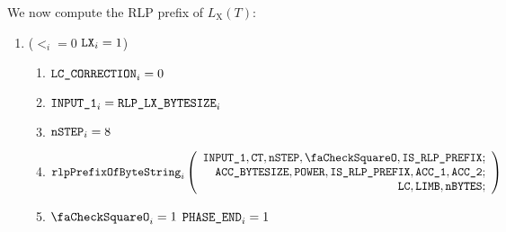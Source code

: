 We now compute the RLP prefix of $L_{\mathrm{X}}(T)$:
\begin{enumerate}[resume]
	\item \If ($\lt_{i}=0$ \et $\texttt{LX}_{i}=1$) \Then
	\begin{enumerate}
		\item $\texttt{LC\_CORRECTION}_{i}=0$
		\item $\texttt{INPUT\_1}_{i} = \texttt{RLP\_LX\_BYTESIZE}_{i}$
		\item $\texttt{nSTEP}_{i}=8$
		\item 
				\[
					\rlpPrefixByteString_{i}
					\left(
					\begin{array}{r}
						\Input1,
						\ct,
						\nbstep,
						\done,
						\phaseRlpPrefix{}; \\
						\accsize,
						\Power,
						\phaseRlpPrefix,
						\acc1,
						\acc2; \\
						\lc,
						\limb,
						\limbsize; \\
					\end{array}
					\right)
				\]
		\item \If $\done_{i}=1$ \Then $\texttt{PHASE\_END}_{i}=1$
	\end{enumerate}
\end{enumerate}
